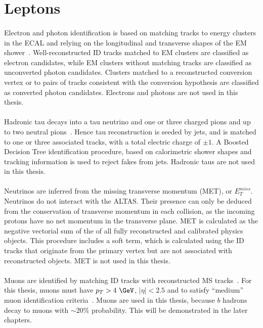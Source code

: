 \section{Leptons}
\paragraph{}
Electron and photon identification is based on matching tracks to energy clusters in the ECAL and relying on the longitudinal and transverse shapes of the EM shower~\cite{ATLAS-CONF-2016-024}. Well-reconstructed ID tracks matched to EM clusters are classified as electron candidates, while EM clusters without matching tracks are classified as unconverted photon candidates. Clusters matched to a reconstructed conversion vertex or to pairs of tracks consistent with the conversion hypothesis are classified as converted photon candidates. Electrons and photons are not used in this thesis.

\paragraph{}
Hadronic tau decays into a tau neutrino and one or three charged pions and up to two neutral pions~\cite{ATLAS-CONF-2017-029}. Hence tau reconstruction is seeded by jets, and  is matched to one or three associated tracks, with a total electric charge of $\pm 1$. A Boosted Decision Tree identification procedure, based on calorimetric shower shapes and tracking information is used to reject fakes from jets. Hadronic taus are not used in this thesis.

\paragraph{}
Neutrinos are inferred from the missing transverse momentum (MET), or $E_T^{miss}$. Neutrinos do not interact with the ALTAS. Their presence can only be deduced from the conservation of transverse momentum in each collision, as the incoming protons have no net momentum in the transverse plane. MET is calculated as the negative vectorial sum of the \pt of all fully reconstructed and calibrated physics objects. This procedure includes a soft term, which is calculated using the ID tracks that originate from the primary vertex but are not associated with reconstructed objects. MET is not used in this thesis.

\paragraph{}
Muons are identified by matching ID tracks with reconstructed MS tracks~\cite{Aad:2016jkr}. For this thesis, muons must have $p_T > 4~\GeV$, $|\eta| < 2.5$ and to satisfy ``medium'' muon identification criteria~\cite{Aad:2016jkr}. Muons are used in this thesis, because $b$ hadrons decay to muons with $\sim 20\%$ probability. This will be demonstrated in the later chapters.



